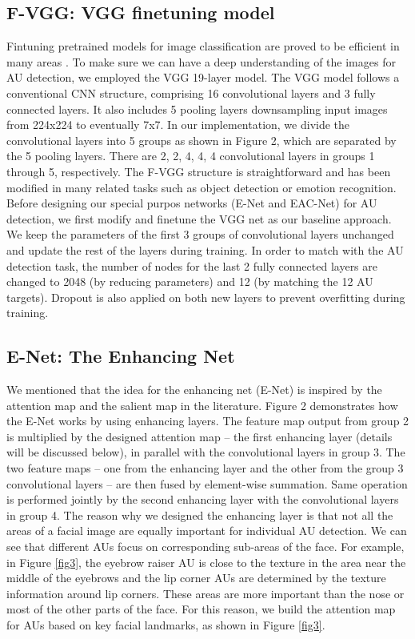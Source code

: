 \documentclass[a4paper, 10pt, conference]{ieeeconf}      %
\begin{document}
\subsection{F-VGG: VGG finetuning model}
Fintuning pretrained models for image classification are proved to be efficient in many areas \cite{p2, p3}. To make sure we can have a deep understanding of the images for AU detection, we employed the VGG 19-layer model. The VGG model follows a conventional CNN structure, comprising 16 convolutional layers and 3 fully connected layers. It also includes 5 pooling layers downsampling input images from 224x224 to eventually 7x7. In our implementation, we divide the convolutional layers into 5 groups as shown in Figure 2, which are separated by the 5 pooling layers. There are 2, 2, 4, 4, 4 convolutional layers in groups 1 through 5, respectively. The F-VGG structure is straightforward and has been modified in many related tasks such as object detection or emotion recognition.  Before designing our special purpos networks (E-Net and EAC-Net) for AU detection, we first modify and finetune the VGG net as our baseline approach. We keep the parameters of the first 3 groups of convolutional layers unchanged and update the rest of the layers during training. In order to match with the AU detection task, the number of nodes for the last 2 fully connected layers are changed to 2048 (by reducing parameters) and 12 (by matching the 12 AU targets). Dropout is also applied on both new layers to prevent overfitting during training.

\subsection{E-Net: The Enhancing Net}
We mentioned that the idea for the enhancing net (E-Net) is inspired by the attention map and the salient map in the literature. Figure 2 demonstrates how the E-Net works by using enhancing layers. The feature map output from group 2 is multiplied by the designed attention map -- the first enhancing layer (details will be discussed below), in parallel with the convolutional layers in group 3. The two feature maps -- one from the enhancing layer and the other from the group 3 convolutional layers --  are then fused by element-wise summation.  Same operation is performed jointly by the second enhancing layer with the convolutional layers in group 4.  The reason why we designed the enhancing layer is that not all the areas of a facial image are equally important for individual AU detection. We can see that different AUs focus on corresponding sub-areas of the face. For example, in Figure \ref{fig3}, the eyebrow raiser AU is close to the texture in the area near the middle of the eyebrows and the lip corner AUs are determined by the texture information around lip corners. These areas are more important than the nose or most of the other parts of the face. For this reason, we build the attention map for AUs based on key facial landmarks, as shown in Figure \ref{fig3}.
\end{document}
